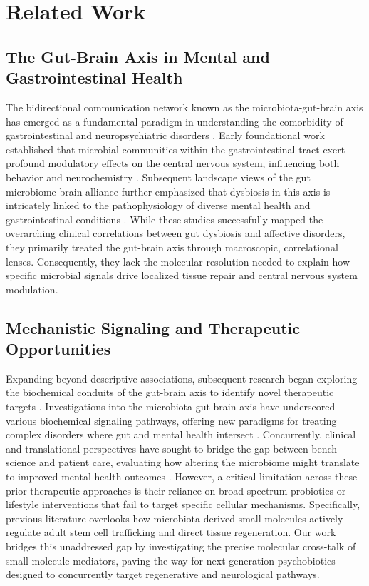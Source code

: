 \documentclass[10pt,twocolumn]{article}
\begin{document}
\section{Related Work}
\subsection{The Gut-Brain Axis in Mental and Gastrointestinal Health}
The bidirectional communication network known as the microbiota-gut-brain axis has emerged as a fundamental paradigm in understanding the comorbidity of gastrointestinal and neuropsychiatric disorders \cite{target_ref}. Early foundational work established that microbial communities within the gastrointestinal tract exert profound modulatory effects on the central nervous system, influencing both behavior and neurochemistry \cite{ref_1}. Subsequent landscape views of the gut microbiome-brain alliance further emphasized that dysbiosis in this axis is intricately linked to the pathophysiology of diverse mental health and gastrointestinal conditions \cite{ref_4}. While these studies successfully mapped the overarching clinical correlations between gut dysbiosis and affective disorders, they primarily treated the gut-brain axis through macroscopic, correlational lenses. Consequently, they lack the molecular resolution needed to explain how specific microbial signals drive localized tissue repair and central nervous system modulation.

\subsection{Mechanistic Signaling and Therapeutic Opportunities}
Expanding beyond descriptive associations, subsequent research began exploring the biochemical conduits of the gut-brain axis to identify novel therapeutic targets \cite{ref_2}. Investigations into the microbiota-gut-brain axis have underscored various biochemical signaling pathways, offering new paradigms for treating complex disorders where gut and mental health intersect \cite{ref_3}. Concurrently, clinical and translational perspectives have sought to bridge the gap between bench science and patient care, evaluating how altering the microbiome might translate to improved mental health outcomes \cite{ref_5}. However, a critical limitation across these prior therapeutic approaches is their reliance on broad-spectrum probiotics or lifestyle interventions that fail to target specific cellular mechanisms. Specifically, previous literature overlooks how microbiota-derived small molecules actively regulate adult stem cell trafficking and direct tissue regeneration. Our work bridges this unaddressed gap by investigating the precise molecular cross-talk of small-molecule mediators, paving the way for next-generation psychobiotics designed to concurrently target regenerative and neurological pathways.
\end{document}
